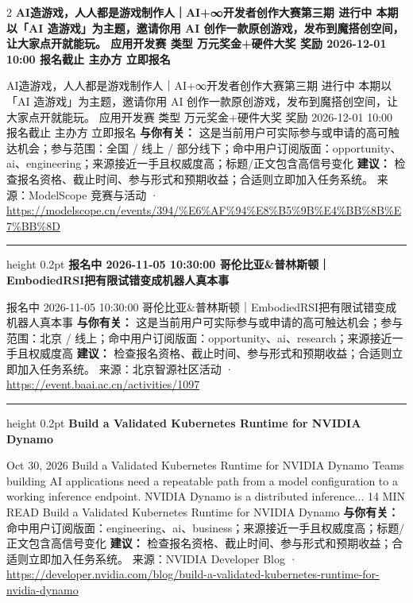 \documentclass[10.5pt]{ctexart}
\begin{document}
\begin{multicols}{2}
{\large\bfseries AI造游戏，人人都是游戏制作人｜AI+∞开发者创作大赛第三期 进行中 本期以「AI 造游戏」为主题，邀请你用 AI 创作一款原创游戏，发布到魔搭创空间，让大家点开就能玩。 应用开发赛 类型 万元奖金+硬件大奖 奖励 2026-12-01 10:00 报名截止 主办方 立即报名}\par
AI造游戏，人人都是游戏制作人｜AI+∞开发者创作大赛第三期 进行中 本期以「AI 造游戏」为主题，邀请你用 AI 创作一款原创游戏，发布到魔搭创空间，让大家点开就能玩。 应用开发赛 类型 万元奖金+硬件大奖 奖励 2026-12-01 10:00 报名截止 主办方 立即报名
\textbf{与你有关：} 这是当前用户可实际参与或申请的高可触达机会；参与范围：全国 / 线上 / 部分线下；命中用户订阅版面：opportunity、ai、engineering；来源接近一手且权威度高；标题/正文包含高信号变化
\textbf{建议：} 检查报名资格、截止时间、参与形式和预期收益；合适则立即加入任务系统。
{\footnotesize\color{ormuted} 来源：ModelScope 竞赛与活动 · \url{https://modelscope.cn/events/394/%E6%AF%94%E8%B5%9B%E4%BB%8B%E7%BB%8D}}
\vspace{2mm}
\hrule height 0.2pt
\vspace{2mm}
{\large\bfseries 报名中 2026-11-05 10:30:00 哥伦比亚\&普林斯顿｜EmbodiedRSI把有限试错变成机器人真本事}\par
报名中 2026-11-05 10:30:00 哥伦比亚\&普林斯顿｜EmbodiedRSI把有限试错变成机器人真本事
\textbf{与你有关：} 这是当前用户可实际参与或申请的高可触达机会；参与范围：北京 / 线上；命中用户订阅版面：opportunity、ai、research；来源接近一手且权威度高
\textbf{建议：} 检查报名资格、截止时间、参与形式和预期收益；合适则立即加入任务系统。
{\footnotesize\color{ormuted} 来源：北京智源社区活动 · \url{https://event.baai.ac.cn/activities/1097}}
\vspace{2mm}
\hrule height 0.2pt
\vspace{2mm}
{\large\bfseries Build a Validated Kubernetes Runtime for NVIDIA Dynamo}\par
Oct 30, 2026 Build a Validated Kubernetes Runtime for NVIDIA Dynamo Teams building AI applications need a repeatable path from a model configuration to a working inference endpoint. NVIDIA Dynamo is a distributed inference... 14 MIN READ Build a Validated Kubernetes Runtime for NVIDIA Dynamo
\textbf{与你有关：} 命中用户订阅版面：engineering、ai、business；来源接近一手且权威度高；标题/正文包含高信号变化
\textbf{建议：} 检查报名资格、截止时间、参与形式和预期收益；合适则立即加入任务系统。
{\footnotesize\color{ormuted} 来源：NVIDIA Developer Blog · \url{https://developer.nvidia.com/blog/build-a-validated-kubernetes-runtime-for-nvidia-dynamo}}

\end{multicols}
\end{document}
